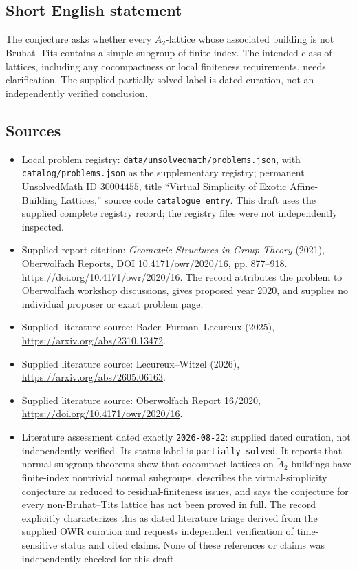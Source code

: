 \documentclass[11pt]{article}
\begin{document}
\subsection{Short English statement}
The conjecture asks whether every \(\widetilde A_2\)-lattice whose associated building is not Bruhat--Tits contains a simple subgroup of finite index. The intended class of lattices, including any cocompactness or local finiteness requirements, needs clarification. The supplied partially solved label is dated curation, not an independently verified conclusion.
\subsection{Sources}
\begin{itemize}
\item Local problem registry: \texttt{data/unsolvedmath/problems.json}, with \texttt{catalog/problems.json} as the supplementary registry; permanent UnsolvedMath ID \(30004455\), title ``Virtual Simplicity of Exotic Affine-Building Lattices,'' source code \texttt{catalogue entry}. This draft uses the supplied complete registry record; the registry files were not independently inspected.
\item Supplied report citation: \emph{Geometric Structures in Group Theory} (2021), Oberwolfach Reports, DOI 10.4171/owr/2020/16, pp. 877--918. \url{https://doi.org/10.4171/owr/2020/16}. The record attributes the problem to Oberwolfach workshop discussions, gives proposed year 2020, and supplies no individual proposer or exact problem page.
\item Supplied literature source: Bader--Furman--Lecureux (2025), \url{https://arxiv.org/abs/2310.13472}.
\item Supplied literature source: Lecureux--Witzel (2026), \url{https://arxiv.org/abs/2605.06163}.
\item Supplied literature source: Oberwolfach Report 16/2020, \url{https://doi.org/10.4171/owr/2020/16}.
\item Literature assessment dated exactly \texttt{2026-08-22}: supplied dated curation, not independently verified. Its status label is \texttt{partially\_solved}. It reports that normal-subgroup theorems show that cocompact lattices on \(\widetilde A_2\) buildings have finite-index nontrivial normal subgroups, describes the virtual-simplicity conjecture as reduced to residual-finiteness issues, and says the conjecture for every non-Bruhat--Tits lattice has not been proved in full. The record explicitly characterizes this as dated literature triage derived from the supplied OWR curation and requests independent verification of time-sensitive status and cited claims. None of these references or claims was independently checked for this draft.
\end{itemize}
\end{document}
